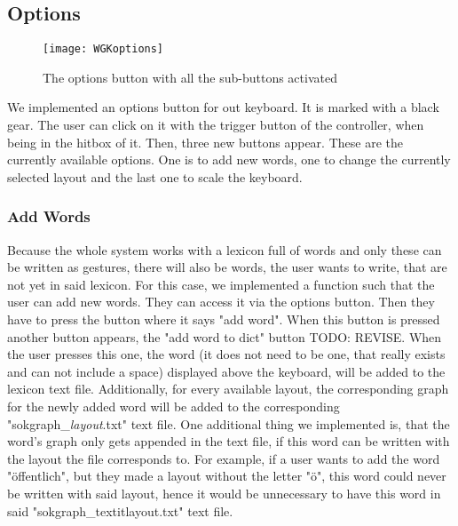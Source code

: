\subsection{Options}

\begin{figure}
\centering
\texttt{[image: WGKoptions]}
\caption{The options button with all the sub-buttons activated}
\end{figure}

We implemented an options button for out keyboard. It is marked with a black gear. The user can click on it with the trigger button of the controller, when being in the hitbox of it. Then, three new buttons appear. These are the currently available options. One is to add new words, one to change the currently selected layout and the last one to scale the keyboard.

\subsubsection{Add Words}
Because the whole system works with a lexicon full of words and only these can be written as gestures, there will also be words, the user wants to write, that are not yet in said lexicon. For this case, we implemented a function such that the user can add new words. They can access it via the options button. Then they have to press the button where it says "add word". When this button is pressed another button appears, the "add word to dict" button TODO: REVISE. When the user presses this one, the word (it does not need to be one, that really exists and can not include a space) displayed above the keyboard, will be added to the lexicon text file. Additionally, for every available layout, the corresponding graph for the newly added word will be added to the corresponding "sokgraph\_\textit{layout}.txt" text file. One additional thing we implemented is, that the word's graph only gets appended in the text file, if this word can be written with the layout the file corresponds to. For example, if a user wants to add the word "öffentlich", but they made a layout without the letter "ö", this word could never be written with said layout, hence it would be unnecessary to have this word in said "sokgraph\_textit{layout}.txt" text file.

